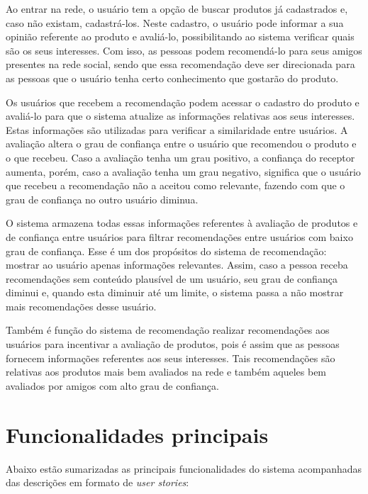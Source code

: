  Ao entrar na rede, o usuário tem a opção de buscar produtos já cadastrados e, caso não existam, cadastrá-los. Neste cadastro, o usuário pode informar a sua opinião referente ao produto e avaliá-lo, possibilitando ao sistema verificar quais são os seus interesses. Com isso, as pessoas podem recomendá-lo para seus amigos presentes na rede social, sendo que essa recomendação deve ser direcionada para as pessoas que o usuário tenha certo conhecimento que gostarão do produto.

 Os usuários que recebem a recomendação podem acessar o cadastro do produto e avaliá-lo para que o sistema atualize as informações relativas aos seus interesses. Estas informações são utilizadas para verificar a similaridade entre usuários. A avaliação altera o grau de confiança entre o usuário que recomendou o produto e o que recebeu. Caso a avaliação tenha um grau positivo, a confiança do receptor aumenta, porém, caso a avaliação tenha um grau negativo, significa que o usuário que recebeu a recomendação não a aceitou como relevante, fazendo com que o grau de confiança no outro usuário diminua.

 O sistema armazena todas essas informações referentes à avaliação de produtos e de confiança entre usuários para filtrar recomendações entre usuários com baixo grau de confiança. Esse é um dos propósitos do sistema de recomendação: mostrar ao usuário apenas informações relevantes. Assim, caso a pessoa receba recomendações sem conteúdo plausível de um usuário, seu grau de confiança diminui e, quando esta diminuir até um limite, o sistema passa a não mostrar mais recomendações desse usuário.

 Também é função do sistema de recomendação realizar recomendações aos usuários para incentivar a avaliação de produtos, pois é assim que as pessoas fornecem informações referentes aos seus interesses. Tais recomendações são relativas aos produtos mais bem avaliados na rede e também aqueles bem avaliados por amigos com alto grau de confiança.

\section{Funcionalidades principais} %
\label{sec:funcionalidades_principais}

Abaixo estão sumarizadas as principais funcionalidades do sistema acompanhadas das descrições em formato de \textit{user stories}:

